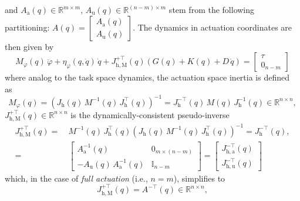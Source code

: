 and $A_\mathrm{a}(q) \in \mathbb{R}^{m \times m}$, $A_\mathrm{u}(q) \in \mathbb{R}^{(n-m) \times m}$ stem from the following partitioning: $A(q) = \begin{bmatrix}
    A_\mathrm{a}(q)\\ A_\mathrm{u}(q)
\end{bmatrix}$.
The dynamics in actuation coordinates are then given by
\begin{equation}
    M_\varphi(q) \, \ddot{\varphi} + \eta_\varphi(q,\dot{q}) \, \dot{q} + J_{\mathrm{h},\mathrm{M}}^{+\top}(q) \left ( G(q) + K(q) + D \, \dot{q} \right ) = \begin{bmatrix}
        \tau\\ 0_{n-m}
    \end{bmatrix}
\end{equation}
where analog to the task space dynamics, the actuation space inertia is defined as~\citep{khatib1987unified}
\begin{equation}\label{eq:background:dynamics:eom_actuation_coordinates}
    M_\varphi(q) = \left ( J_\mathrm{h}(q) \, M^{-1}(q) \, J_\mathrm{h}^\top(q) \right )^{-1} = J_\mathrm{h}^{-\top}(q) \, M(q) \, J_\mathrm{h}^{-1}(q) \in \mathbb{R}^{n \times n},
\end{equation}
$J_{\mathrm{h},\mathrm{M}}^{+\top}(q) \in \mathbb{R}^{n \times n}$ is the dynamically-consistent pseudo-inverse~\citep{chang1995manipulator}
\begin{equation}
\begin{split}
    J_{\mathrm{h},\mathrm{M}}^{+\top}(q) =& \: M^{-1}(q) \, J_\mathrm{h}^\top(q) \left ( J_\mathrm{h}(q) \, M^{-1}(q) \, J_\mathrm{h}^\top(q) \right )^{-1} = J_\mathrm{h}^{-\top}(q),\\
    =& \: \begin{bmatrix}
        A_\mathrm{a}^{-1}(q) & 0_{m \times (n-m)}\\
        -A_\mathrm{u}(q) \, A_\mathrm{a}^{-1}(q) & \mathbb{I}_{n-m}
    \end{bmatrix} = \begin{bmatrix}
        J_{\mathrm{h},\mathrm{a}}^{-\top}(q)\\
        J_{\mathrm{h},\mathrm{u}}^{-\top}(q)
    \end{bmatrix}
\end{split}
\end{equation}
which, in the case of \emph{full actuation} (i.e., $n=m$), simplifies to
\begin{equation}
    J_{\mathrm{h},\mathrm{M}}^{+\top}(q) = A^{-\top}(q) \in \mathbb{R}^{n \times n},
\end{equation}
